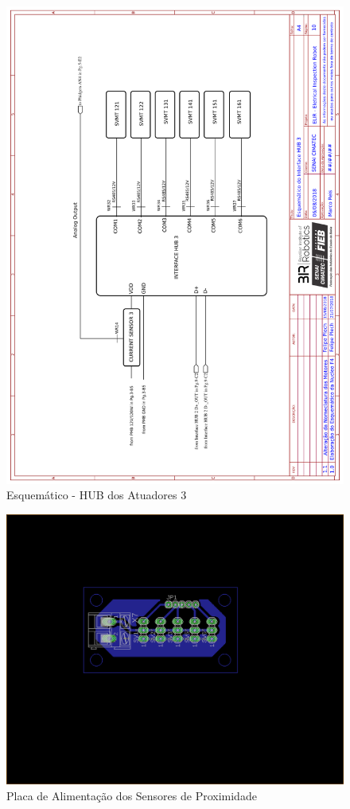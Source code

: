     \begin{figure}[H]
	\centering
	\includegraphics[width=14cm]{Figures/EsquematicoHUB3.png}
	\caption{Esquemático - HUB dos Atuadores 3} \label{HUB3}
	\end{figure}
	
	\pagebreak
	
    \begin{figure}[H]
	\centering
	\includegraphics[width=14cm]{Figures/board.png}
	\caption{Placa de Alimentação dos Sensores de Proximidade} \label{5vHUB}
	\end{figure}